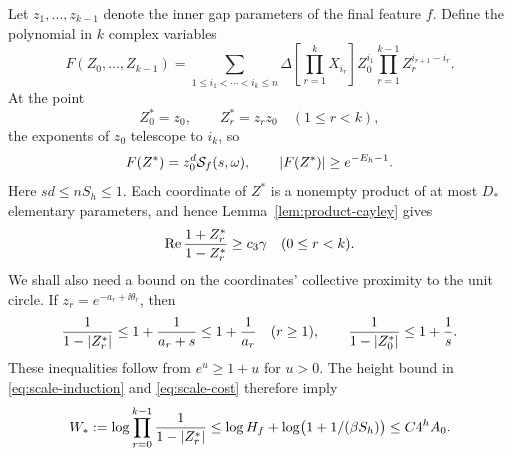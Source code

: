 Let $z_1,\ldots,z_{k-1}$ denote the inner gap parameters of the final
feature $f$.  Define the polynomial in $k$ complex variables
\begin{equation}
 F(Z_0,\ldots,Z_{k-1})
 =\sum_{1\le i_1<\cdots<i_k\le n}
  \Delta\left[\prod_{r=1}^kX_{i_r}\right]
  Z_0^{i_1}\prod_{r=1}^{k-1}Z_r^{i_{r+1}-i_r}.
 \label{eq:input-polynomial}
\end{equation}
At the point
\[
 Z_0^*=z_0,\qquad Z_r^*=z_rz_0\quad(1\le r<k),
\]
the exponents of $z_0$ telescope to $i_k$, so
\begin{equation}
 F(Z^*)=z_0^d\mathcal S_f(s,\omega),
 \qquad \lvert F(Z^*)\rvert\ge e^{-E_h-1}.
 \label{eq:input-polynomial-signal}
\end{equation}
Here $sd\le nS_h\le1$.  Each coordinate of $Z^*$ is a nonempty
product of at most $D_*$ elementary parameters, and hence
Lemma~\ref{lem:product-cayley} gives
\begin{equation}
 \operatorname{Re}\frac{1+Z_r^*}{1-Z_r^*}\ge c_3\gamma\quad(0\le r<k).
 \label{eq:input-cayley-margin}
\end{equation}
We shall also need a bound on the coordinates' collective proximity to
the unit circle.  If $z_r=e^{-a_r+\ii\theta_r}$, then
\[
 \frac1{1-\lvert Z_r^*\rvert}
 \le1+\frac1{a_r+s}\le1+\frac1{a_r}\quad(r\ge1),
 \qquad
 \frac1{1-\lvert Z_0^*\rvert}\le1+\frac1s.
\]
These inequalities follow from $e^u\ge1+u$ for $u>0$.
The height bound in \eqref{eq:scale-induction} and
\eqref{eq:scale-cost} therefore imply
\begin{equation}
 W_*:=\log\prod_{r=0}^{k-1}\frac1{1-\lvert Z_r^*\rvert}
 \le\log H_f+\log\bigl(1+1/(\beta S_h)\bigr)
 \le C4^h A_0.
 \label{eq:input-boundary-cost}
\end{equation}

